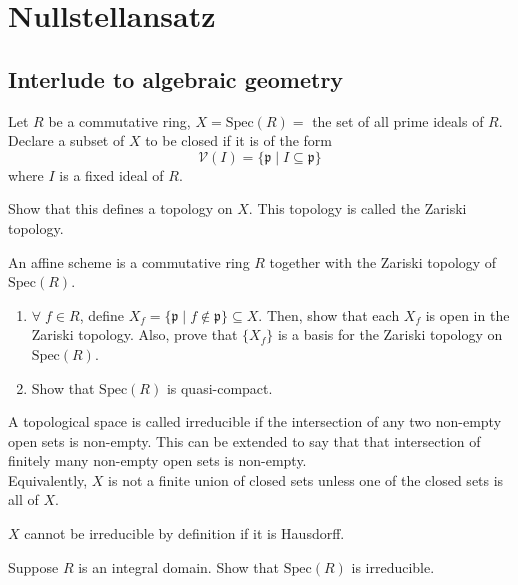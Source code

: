 \documentclass[oneside, 12pt]{scrbook}
\newcommand{\V}{\mathcal{V}}
\newcommand{\spec}{\mathrm{Spec}}
\newcommand{\pr}{\mathfrak{p}}
\theoremstyle{theorem}
\begin{document}
\chapter{Nullstellansatz}

\section{Interlude to algebraic geometry}

Let $R$ be a commutative ring, $X = \spec(R) =$ the set of all prime ideals of $R$. Declare a subset of $X$ to be closed if it is of the form $$\V(I) = \{\pr \mid I \subseteq \pr \}$$ where $I$ is a fixed ideal of $R$. 

\begin{exercise}
Show that this defines a topology on $X$. This topology is called the Zariski topology.
\end{exercise}

\begin{definition}
An affine scheme is a commutative ring $R$ together with the Zariski topology of $\spec(R)$.
\end{definition}

\begin{exercise}
\begin{enumerate}
\item $\forall \; f\in R$, define $X_{f} = \{\pr \mid f \not \in \pr\} \subseteq X$. Then, show that each $X_{f}$ is open in the Zariski topology. Also, prove that $\{X_{f}\}$ is a basis for the Zariski topology on $\spec(R)$.
\item Show that $\spec(R)$ is quasi-compact.
\end{enumerate}
\end{exercise}

\begin{definition}
A topological space is called irreducible if the intersection of any two non-empty open sets is non-empty. This can be extended to say that that intersection of finitely many non-empty open sets is non-empty. \\
Equivalently, $X$ is not a finite union of closed sets unless one of the closed sets is all of $X$.
\end{definition}

\begin{remark}
$X$ cannot be irreducible by definition if it is Hausdorff.
\end{remark}

\begin{exercise}
Suppose $R$ is an integral domain. Show that $\spec(R)$ is irreducible.
\end{exercise}
\end{document}
